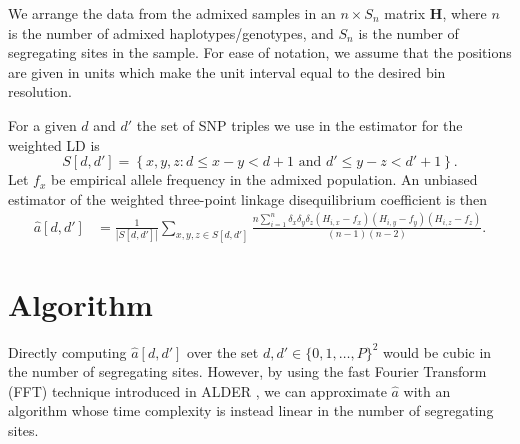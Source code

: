 \documentclass[10pt]{article}
\begin{document}
We arrange the data from the admixed samples in an $n\times S_n $ matrix
$\mathbf{H}$, where $n$ is the number of admixed haplotypes/genotypes, and $S_n$
is the number of segregating sites in the sample. For ease of notation, we
assume that the positions are given in units which make the unit interval equal
to the desired bin resolution.

For a given $d$ and $d'$ the set of SNP triples we use in the estimator for the
weighted LD is $$ S[d,d'] = \left\{x,y,z: d\leq  x-y < d+1 \text{ and } d' \leq
y-z < d'+1 \right\}. $$ Let $f_x$ be empirical allele frequency in the admixed
population. An unbiased estimator of the weighted three-point linkage
disequilibrium coefficient is then \begin{align*} \hat{a}[d,d']&=
\frac{1}{|S[d,d']|} \sum_{x,y,z\in S[d,d']}\frac{n\sum_{i=1}^n
\delta_x\delta_y\delta_z(H_{i,x}-f_x)(H_{i,y}-f_y)(H_{i,z}-f_z)}{(n-1)(n-2)}.
\end{align*}

\section{Algorithm}
Directly computing $\hat{a}[d,d']$ over the set $d,d'\in \{0,1,\dots,P\}^2$
would be cubic in the number of segregating sites. However, by using the fast
Fourier Transform (FFT) technique introduced in ALDER \cite{loh2013inferring},
we can approximate $\hat{a}$ with an algorithm whose time complexity is instead
linear in the number of segregating sites.
\end{document}
